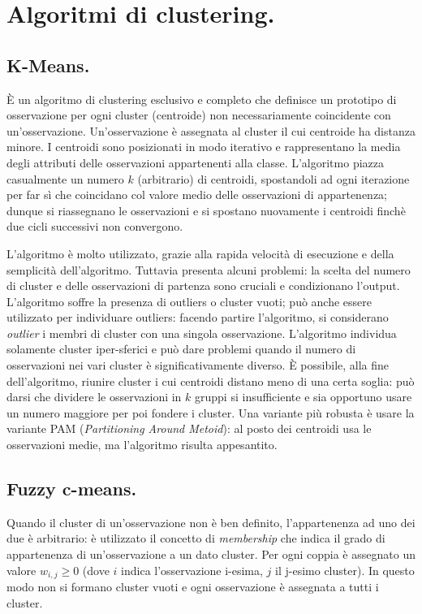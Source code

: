 \documentclass[11pt, a4page, twocolumn]{article}
\begin{document}
\section{Algoritmi di clustering.}
\subsection{K-Means.}
È un algoritmo di clustering esclusivo e completo che definisce un prototipo di osservazione per ogni cluster (centroide) non necessariamente coincidente con un'osservazione.
Un'osservazione è assegnata al cluster il cui centroide ha distanza minore.
I centroidi sono posizionati in modo iterativo e rappresentano la media degli attributi delle osservazioni appartenenti alla classe.
L'algoritmo piazza casualmente un numero $k$ (arbitrario) di centroidi, spostandoli ad ogni iterazione per far sì che coincidano col valore medio delle osservazioni di appartenenza; dunque si riassegnano le osservazioni e si spostano nuovamente i centroidi finchè due cicli successivi non convergono.

L'algoritmo è molto utilizzato, grazie alla rapida velocità di esecuzione e della semplicità dell'algoritmo.
Tuttavia presenta alcuni problemi: la scelta del numero di cluster e delle osservazioni di partenza sono cruciali e condizionano l'output.
L'algoritmo soffre la presenza di outliers o cluster vuoti; può anche essere utilizzato per individuare outliers: facendo partire l'algoritmo, si considerano \textit{outlier} i membri di cluster con una singola osservazione.
L'algoritmo individua solamente cluster iper-sferici e può dare problemi quando il numero di osservazioni nei vari cluster è significativamente diverso.
È possibile, alla fine dell'algoritmo, riunire cluster i cui centroidi distano meno di una certa soglia: può darsi che dividere le osservazioni in $k$ gruppi si insufficiente e sia opportuno usare un numero maggiore per poi fondere i cluster.
Una variante più robusta è usare la variante PAM (\textit{Partitioning Around Metoid}): al posto dei centroidi usa le osservazioni medie, ma l'algoritmo risulta appesantito.

\subsection{Fuzzy c-means.}
Quando il cluster di un'osservazione non è ben definito, l'appartenenza ad uno dei due è arbitrario: è utilizzato il concetto di \textit{membership} che indica il grado di appartenenza di un'osservazione a un dato cluster.
Per ogni coppia è assegnato un valore $w_{i,j} \ge 0$ (dove $i$ indica l'osservazione i-esima, $j$ il j-esimo cluster).
In questo modo non si formano cluster vuoti e ogni osservazione è assegnata a tutti i cluster.
\end{document}
